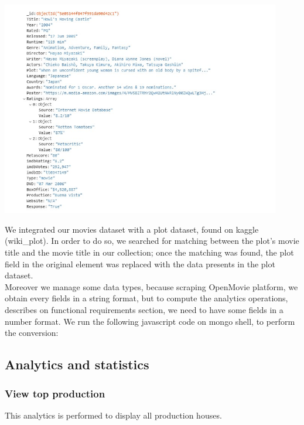 \documentclass[a4paper, oneside]{article}
\begin{document}
\begin{minipage}{\linewidth}
\begin{center}
\vspace{1mm}
\includegraphics[height = 94mm]{./images/screens/elementJSONExample.jpg} 
\vspace{6mm}
\label{fig:elementJSONExample}
\vspace{5mm}
\end{center}
\end{minipage}
We integrated our movies dataset with a plot dataset, found on kaggle (wiki\_plot). In order to do so, we searched for matching between the plot’s movie title and the movie title in our collection; once the matching was found, the plot field in the original element was replaced with the data presents in the plot dataset.\\
Moreover we manage some data types, because scraping OpenMovie platform, we obtain every fields in a string format, but to compute the analytics operations, describes on functional requirements section, we need to have some fields in a number format. We run the following javascript code on mongo shell, to perform the conversion:
\vspace{2mm}

\vspace{5mm}

\subsection{Analytics and statistics}
\subsubsection{View top production}
This analytics is performed to display all production houses.
\end{document}
